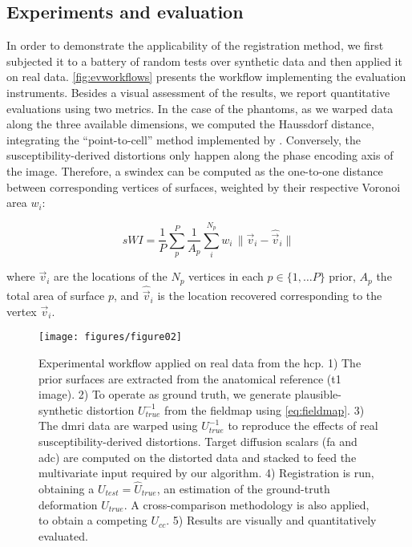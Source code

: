\subsection*{Experiments and evaluation}
\label{sec:experiments_evaluation}
%
In order to demonstrate the applicability of the registration method, we first
  subjected it to a battery of random tests over synthetic data and then applied
  it on real data.
\autoref{fig:evworkflows} presents the workflow implementing the evaluation instruments.
Besides a visual assessment of the results, we report quantitative evaluations using
  two metrics.
In the case of the phantoms, as we warped data along the three available dimensions,
  we computed the Haussdorf distance, integrating the ``point-to-cell'' method
	implemented by \cite{commandeur_vtk_2011}.
Conversely, the susceptibility-derived distortions only happen along the phase
  encoding axis of the image.
Therefore, a \gls*{swindex} can be computed as the one-to-one distance between corresponding
  vertices of surfaces, weighted by their respective Voronoi area $w_i$:

  \begin{equation}
  sWI = \frac{1}{P} \sum\limits_p^P \frac{1}{A_p} \sum\limits_i^{N_p} w_i\,\|
  \vec{v}_i - \hat{\vec{v}}_i \|
  \end{equation}

  where $\vec{v}_i$ are the locations of the $N_p$ vertices in each $p \in \{1, \dots P\}$
  prior, $A_p$ the total area of surface $p$, and $\hat{\vec{v}}_i$ is the location
  recovered corresponding to the vertex $\vec{v}_i$.


\begin{figure*}
\texttt{[image: figures/figure02]}
\caption{Experimental workflow applied on real data from the \gls*{hcp}.
  1) The prior surfaces are extracted from the anatomical reference (\gls*{t1} image).
	2) To operate as ground truth, we generate plausible-synthetic distortion $U^{-1}_{true}$
	  from the fieldmap using \eqref{eq:fieldmap}.
	3) The \gls*{dmri} data are warped using $U^{-1}_{true}$ to reproduce the effects of real
	  susceptibility-derived distortions.
	Target diffusion scalars (\gls*{fa} and \gls*{adc}) are computed on the distorted data and
		stacked to feed the multivariate input required by our algorithm.
	4) Registration is run, obtaining a $U_{test} = \hat{U}_{true}$, an estimation of
	  the ground-truth deformation $U_{true}$.
	  A cross-comparison methodology is also applied, to obtain a competing $U_{cc}$.
	5) Results are visually and quantitatively evaluated.}\label{fig:evworkflows}
\end{figure*}


